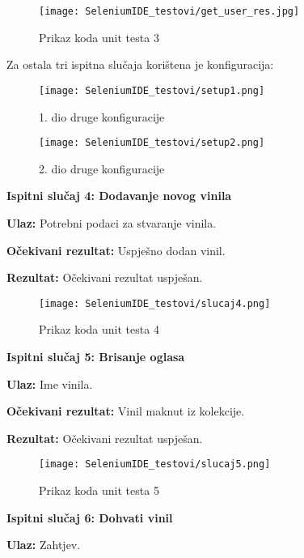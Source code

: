 				\begin{figure}[H]
					\texttt{[image: SeleniumIDE\_testovi/get\_user\_res.jpg]}
					\centering
					\caption{Prikaz koda unit testa 3}
					\label{fig:kod_test3}
				\end{figure}
				
Za ostala tri ispitna slučaja korištena je konfiguracija: 

				\begin{figure}[H]
					\texttt{[image: SeleniumIDE\_testovi/setup1.png]}
					\centering
					\caption{1. dio druge konfiguracije}
					\label{fig:konf1}
				\end{figure}
				
				\begin{figure}[H]
					\texttt{[image: SeleniumIDE\_testovi/setup2.png]}
					\centering
					\caption{2. dio druge konfiguracije}
					\label{fig:konf2}
				\end{figure}

\noindent\textbf{Ispitni slučaj 4: Dodavanje novog vinila}

	\noindent\textbf{Ulaz:}
		Potrebni podaci za stvaranje vinila.
		
	\noindent\textbf{Očekivani rezultat:}
		Uspješno dodan vinil.
		
	\noindent\textbf{Rezultat:}
		Očekivani rezultat uspješan.
				
				\begin{figure}[H]
					\texttt{[image: SeleniumIDE\_testovi/slucaj4.png]}
					\centering
					\caption{Prikaz koda unit testa 4}
					\label{fig:kod_test4}
				\end{figure}

\noindent\textbf{Ispitni slučaj 5: Brisanje oglasa}

	\noindent\textbf{Ulaz:}
		Ime vinila.
	
	\noindent\textbf{Očekivani rezultat:}
		Vinil maknut iz kolekcije.
		
	\noindent\textbf{Rezultat:}
		Očekivani rezultat uspješan.
				
				\begin{figure}[H]
					\texttt{[image: SeleniumIDE\_testovi/slucaj5.png]}
					\centering
					\caption{Prikaz koda unit testa 5}
					\label{fig:kod_test5}
				\end{figure}

\noindent\textbf{Ispitni slučaj 6: Dohvati vinil}

	\noindent\textbf{Ulaz:}
		Zahtjev.
	
